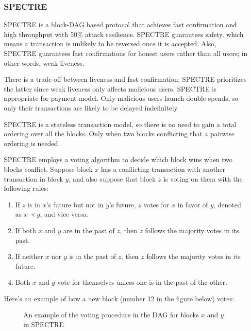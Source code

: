 \documentclass[a4paper,11pt]{article}
\begin{document}
\subsubsection{SPECTRE}
SPECTRE is a block-DAG based protocol that achieves fast confirmation and high
throughput with 50\% attack resilience. SPECTRE guarantees safety, which means a
transaction is unlikely to be reversed once it is accepted. Also, SPECTRE guarantees fast confirmations for honest users rather than all users; in other words, weak liveness.

There is a trade-off between liveness and fast confirmation; SPECTRE prioritizes
the latter since weak liveness only affects malicious users. SPECTRE is appropriate for payment model. Only malicious users launch double spends, so only their
transactions are likely to be delayed indefinitely.

SPECTRE is a stateless transaction model, so there is no need to gain a
total ordering over all the blocks. Only when two blocks conflicting
that a pairwise ordering is needed.

SPECTRE employs a voting algorithm to decide which block wins when two blocks
conflict. Suppose block $x$ has a conflicting transaction with another
transaction in block $y$, and also suppose that block $z$ is voting on them with
the following rules:

\begin{enumerate}
	\item If $z$ is in $x$'s future but not in $y$'s future, $z$ votes for
		$x$ in favor of $y$, denoted as $x \prec y$, and vice versa.
	\item If both $x$ and $y$ are in the past of $z$, then $z$ follows the majority votes in its past.
	\item If neither $x$ nor $y$ is in the past of $z$, then $z$ follows the majority votes in its future.
	\item Both $x$ and $y$ vote for themselves unless one is in the past of
		the other.
\end{enumerate}


Here's an example of how a new block (number 12 in the figure below) votes:

\begin{figure}[ht]
	\centerline{%
	}
\caption{An example of the voting procedure in the DAG for blocks $x$ and $y$ in SPECTRE}
\end{figure}
\end{document}
